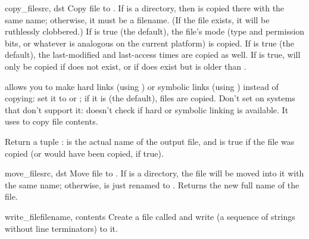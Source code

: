 \documentclass{manual}
\begin{document}
\begin{funcdesc}{copy_file}{src, dst}
Copy file  to . If  is a directory, then
 is copied there with the same name; otherwise, it must be a
filename. (If the file exists, it will be ruthlessly clobbered.) If
 is true (the default), the file's mode (type and
permission bits, or whatever is analogous on the current platform) is
copied. If  is true (the default), the last-modified
and last-access times are copied as well. If  is true,
 will only be copied if  does not exist, or if
 does exist but is older than .

 allows you to make hard links (using ) or
symbolic links (using ) instead of copying: set it
to  or ; if it is  (the default),
files are copied. Don't set  on systems that don't support
it:  doesn't check if hard or symbolic linking is
available.  It uses  to copy file contents.

Return a tuple :  is the actual 
name of the output file, and  is true if the file was copied 
(or would have been copied, if  true).
\end{funcdesc}

\begin{funcdesc}{move_file}{src, dst}
Move file  to . If  is a directory, the file will
be moved into it with the same name; otherwise,  is just renamed
to .  Returns the new full name of the file.
\end{funcdesc}

\begin{funcdesc}{write_file}{filename, contents}
Create a file called  and write  (a
sequence of strings without line terminators) to it.
\end{funcdesc}
\end{document}
